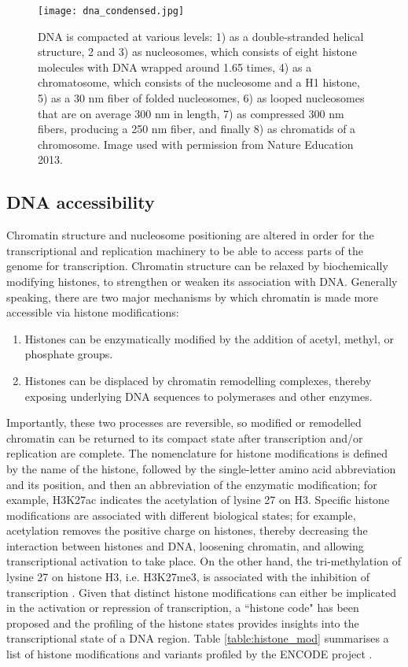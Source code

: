 \begin{figure}[!ht]
   \centering
   \texttt{[image: dna\_condensed.jpg]}
   \caption[DNA packaging]{DNA is compacted at various levels: 1) as a double-stranded helical structure, 2 and 3) as nucleosomes, which consists of eight histone molecules with DNA wrapped around 1.65 times, 4) as a chromatosome, which consists of the nucleosome and a H1 histone, 5) as a 30 nm fiber of folded nucleosomes, 6) as looped nucleosomes that are on average 300 nm in length, 7) as compressed 300 nm fibers, producing a 250 nm fiber, and finally 8) as chromatids of a chromosome. Image used with permission from Nature Education 2013.}
   \label{fig:dna_condensed}
\end{figure}

\subsection{DNA accessibility}

Chromatin structure and nucleosome positioning are altered in order for the transcriptional and replication machinery to be able to access parts of the genome for transcription. Chromatin structure can be relaxed by biochemically modifying histones, to strengthen or weaken its association with DNA. Generally speaking, there are two major mechanisms by which chromatin is made more accessible via histone modifications:

\begin{enumerate}
   \item Histones can be enzymatically modified by the addition of acetyl, methyl, or phosphate groups.
   \item Histones can be displaced by chromatin remodelling complexes, thereby exposing underlying DNA sequences to polymerases and other enzymes.
\end{enumerate}

Importantly, these two processes are reversible, so modified or remodelled chromatin can be returned to its compact state after transcription and/or replication are complete. The nomenclature for histone modifications is defined by the name of the histone, followed by the single-letter amino acid abbreviation and its position, and then an abbreviation of the enzymatic modification; for example, H3K27ac indicates the acetylation of lysine 27 on H3. Specific histone modifications are associated with different biological states; for example, acetylation removes the positive charge on histones, thereby decreasing the interaction between histones and DNA, loosening chromatin, and allowing transcriptional activation to take place. On the other hand, the tri-methylation of lysine 27 on histone H3, i.e. H3K27me3, is associated with the inhibition of transcription \citep{pmid21652639}. Given that distinct histone modifications can either be implicated in the activation or repression of transcription, a ``histone code" has been proposed \citep{pmid11498575} and the profiling of the histone states provides insights into the transcriptional state of a DNA region. Table \ref{table:histone_mod} summarises a list of histone modifications and variants profiled by the ENCODE project \citep{pmid22955616}.

